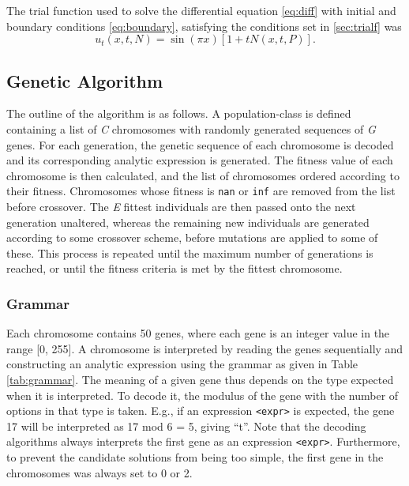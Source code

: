 \documentclass[multicolumn, 10pt]{extarticle}
\begin{document}
The trial function used to solve the differential equation \eqref{eq:diff} with initial and boundary conditions \eqref{eq:boundary}, satisfying the conditions set in \ref{sec:trialf} was
\begin{equation}
	u_t(x, t, N) = \sin{(\pi x)}[1 + tN(x, t, P)].
\end{equation}



\subsection{Genetic Algorithm}
The outline of the algorithm is as follows. A population-class is defined containing a list of \textit{C} chromosomes with randomly generated sequences of \textit{G} genes. For each generation, the genetic sequence of each chromosome is decoded and its corresponding analytic expression is generated. The fitness value of each chromosome is then calculated, and the list of chromosomes ordered according to their fitness. Chromosomes whose fitness is \texttt{nan} or \texttt{inf} are removed from the list before crossover. The \textit{E} fittest individuals are then passed onto the next generation unaltered, whereas the remaining new individuals are generated according to some crossover scheme, before mutations are applied to some of these.  This process is repeated until the maximum number of generations is reached, or until the fitness criteria is met by the fittest chromosome.

\subsubsection{Grammar}
Each chromosome contains 50 genes, where each gene is an integer value in the range [0, 255]. A chromosome is interpreted by reading the genes sequentially and constructing an analytic expression using the grammar as given in Table \ref{tab:grammar}.  The meaning of a given gene thus depends on the type expected when it is interpreted. To decode it, the modulus of the gene with the number of options in that type is taken. E.g., if an expression \texttt{<expr>} is expected, the gene 17 will be interpreted as 17 mod 6 = 5, giving ``t''. Note that the decoding algorithms always interprets the first gene as an expression \texttt{<expr>}.  Furthermore, to prevent the candidate solutions from being too simple, the first gene in the chromosomes was always set to 0 or 2.
\end{document}
